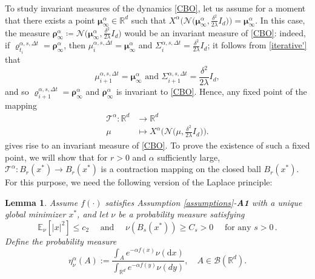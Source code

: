 \documentclass[reqno]{amsart}
\numberwithin{algorithm}{section}
\newcommand{\diff}{\mathrm{d}}
\newcommand{\RR}{\mathbb{R}}
\newcommand{\EE}{{\mathbb E}}
\newcommand{\mc}[1]{\mathcal{#1}}
\newtheorem{lemma}[theorem]{Lemma}
\begin{document}
{To study invariant measures of the dynamics \eqref{CBO}, let us assume for a moment that there exists a point $\boldsymbol\mu^\alpha_\infty\in\RR^d$ such that $X^\alpha\Big(\mc{N}\big(\boldsymbol\mu^\alpha_\infty,\frac{\delta^2}{2\lambda}I_d\big)\Big) = \boldsymbol\mu^\alpha_\infty$. In this case, the measure $\boldsymbol\rho^\alpha_\infty \coloneqq \mc{N}\big(\boldsymbol\mu^\alpha_\infty,\frac{\delta^2}{2\lambda}I_d\big)$ would be an invariant measure of \eqref{CBO}: indeed, if $\varrho^{\alpha,s,\Delta t}_{t_i}=\boldsymbol\rho^\alpha_\infty$, then $\mu^{\alpha,s,\Delta t}_i=\boldsymbol\mu^\alpha_\infty$ and $\Sigma_i^{\alpha,s,\Delta t}=\frac{\delta^2}{2\lambda}I_d$; it follows from \eqref{iterative'} that 
\begin{equation}
    \mu^{\alpha,s,\Delta t}_{i+1}= \boldsymbol\mu^\alpha_\infty\mbox{ and }\Sigma_{i+1}^{\alpha,s,\Delta t}=\frac{\delta^2}{2\lambda}I_d,
\end{equation}
and so $\varrho^{\alpha,s,\Delta t}_{i+1}=\boldsymbol\rho^\alpha_\infty$ and $\boldsymbol\rho^\alpha_\infty$ is invariant to \eqref{CBO}. Hence, any fixed point of the mapping
\begin{equation}\label{eq:T_alpha}
    \begin{split}
        \mc{T}^\alpha\colon\RR^d&\to \RR^d \\
        \mu &\mapsto X^\alpha\Big(\mc{N}\big(\mu,\frac{\delta^2}{2\lambda}I_d\big)\Big).
    \end{split}
\end{equation} 
gives rise to an invariant measure of \eqref{CBO}. To prove the existence of such a fixed point, we will show that for $r > 0$ and $\alpha$ sufficiently large, $\mc{T}^\alpha\colon B_r(x^*) \to B_r(x^*)$ is a contraction mapping on the closed ball $B_r(x^*)$. For this purpose, we need the following version of the Laplace principle:
\begin{lemma}\label{lem:laplace}
    Assume $f(\cdot)$ satisfies Assumption \ref{assumptions}-\textbf{A1} with a unique global minimizer $x^*$, and let $\nu$ be a probability measure satisfying
    \begin{equation}\label{eq:nuassum}
        \EE_\nu[|x|^2]\leq c_2\quad \mbox{ and }\quad  \nu (B_s(x^*))\geq C_s>0\quad \mbox{ for any } s>0\,.
    \end{equation}
Define the probability measure
    \begin{equation}\label{eq:eta}
        \eta_\nu^\alpha(A):=\frac{\int_{A}e^{-\alpha f(x)}\nu(\diff x)}{\int_{\RR^d}e^{-\alpha f(y)}\nu(dy)},\quad A\in \mc{B}(\RR^d).

\end{equation}
\end{lemma}}
\end{document}

